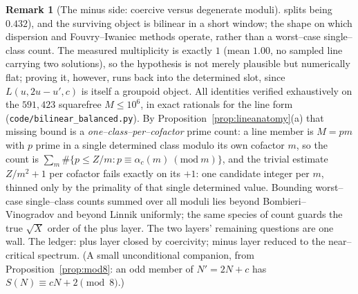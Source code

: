 \documentclass[11pt]{article}
\theoremstyle{definition}
\newtheorem{remark}[theorem]{Remark}
\begin{document}
\begin{remark}[The minus side: coercive versus degenerate moduli]
splits being $0.432$), and the surviving object is bilinear in a short window; the shape on which
dispersion and Fouvry--Iwaniec methods operate, rather than a worst--case single--class count. The
measured multiplicity is exactly $1$ (mean $1.00$, no sampled line carrying two solutions), so the
hypothesis is not merely plausible but numerically flat; proving it, however, runs back into the
determined slot, since $L(u,2u-u',c)$ is itself a groupoid object. All identities verified
exhaustively on the $591{,}423$ squarefree $M\le10^6$, in exact rationals for the line form
(\texttt{code/bilinear\_balanced.py}). By
Proposition~\ref{prop:lineanatomy}(a) that missing bound is a \emph{one--class--per--cofactor}
prime count: a line member is $M=pm$ with $p$ prime in a single determined class modulo its own
cofactor $m$, so the count is $\sum_m\#\{p\le Z/m:p\equiv\alpha_c(m)\ (\mathrm{mod}\ m)\}$, and the
trivial estimate $Z/m^2+1$ per cofactor fails exactly on its $+1$: one candidate integer per $m$,
thinned only by the primality of that single determined value. Bounding worst--case single--class
counts summed over all moduli lies beyond Bombieri--Vinogradov and beyond Linnik uniformly; the
same species of count guards the true $\sqrt X$ order of the plus layer. The two layers' remaining
questions are one wall. The ledger: plus layer closed by coercivity; minus layer reduced to the
near--critical spectrum. (A small
unconditional companion, from Proposition~\ref{prop:mod8}: an odd member of $N'=2N+c$ has
$S(N)\equiv cN+2\pmod8$.)
\end{remark}
\end{document}
